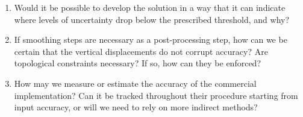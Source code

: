 \begin{enumerate}
\begin{enumerate}
        \item Would it be possible to develop the solution in a way that it can indicate where levels of uncertainty drop below the prescribed threshold, and why?
        \item If smoothing steps are necessary as a post-processing step, how can we be certain that the vertical displacements do not corrupt accuracy? Are topological constraints necessary? If so, how can they be enforced?
        \item How may we measure or estimate the accuracy of the commercial implementation? Can it be tracked throughout their procedure starting from input accuracy, or will we need to rely on more indirect methods?
    \end{enumerate}
\end{enumerate}